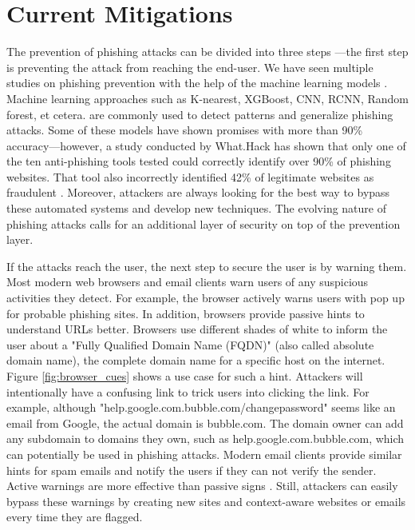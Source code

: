 \section{Current Mitigations}
The prevention of phishing attacks can be divided into three steps \cite{vayansky}—the first step is preventing the attack from reaching the end-user. We have seen multiple studies on phishing prevention with the help of the machine learning models \cite{yang_zheng_wu_wu_wang_2021, sahingoz_buber_demir_diri_2019}. Machine learning approaches such as K-nearest, XGBoost, CNN, RCNN, Random forest, et cetera. are commonly used to detect patterns and generalize phishing attacks. Some of these models have shown promises with more than 90\% accuracy—however, a study conducted by What.Hack has shown that only one of the ten anti-phishing tools tested could correctly identify over 90\% of phishing websites. That tool also incorrectly identified 42\% of legitimate websites as fraudulent \cite{what_hack}. Moreover, attackers are always looking for the best way to bypass these automated systems and develop new techniques. The evolving nature of phishing attacks calls for an additional layer of security on top of the prevention layer.

If the attacks reach the user, the next step to secure the user is by warning them. Most modern web browsers and email clients warn users of any suspicious activities they detect. For example, the browser actively warns users with pop up for probable phishing sites. In addition, browsers provide passive hints to understand URLs better. Browsers use different shades of white to inform the user about a "Fully Qualified Domain Name (FQDN)" (also called absolute domain name), the complete domain name for a specific host on the internet. Figure \ref{fig:browser_cues} shows a use case for such a hint. Attackers will intentionally have a confusing link to trick users into clicking the link. For example, although "help.google.com.bubble.com/changepassword" seems like an email from Google, the actual domain is bubble.com. The domain owner can add any subdomain to domains they own, such as help.google.com.bubble.com, which can potentially be used in phishing attacks. Modern email clients provide similar hints for spam emails and notify the users if they can not verify the sender. Active warnings are more effective than passive signs \cite{vayansky}. Still, attackers can easily bypass these warnings by creating new sites and context-aware websites or emails every time they are flagged.

